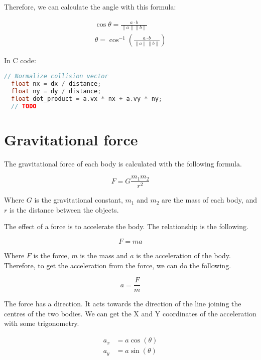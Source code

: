 \documentclass{amsart}
\begin{document}
Therefore, we can calculate the angle with this formula:

\begin{align*}
  \cos \theta = \frac{a \cdot b}{\|a\| \|b\|} \\
  \theta = \cos^{-1}(\frac{a \cdot b}{\|a\| \|b\|})
\end{align*}

In C code:

\begin{lstlisting}[language=C]
  // Normalize collision vector
  float nx = dx / distance;
  float ny = dy / distance;
  float dot_product = a.vx * nx + a.vy * ny;
  // TODO
\end{lstlisting}

\newpage

\section{Gravitational force}

The gravitational force of each body is calculated with the following formula.

\begin{displaymath}
  F = G \frac{m_1m_2}{r^2}
\end{displaymath}

Where $G$ is the gravitational constant, $m_1$ and $m_2$ are the mass of each
body, and $r$ is the distance between the objects.

The effect of a force is to accelerate the body. The relationship is the
following.

\begin{displaymath}
  F = m a
\end{displaymath}

Where $F$ is the force, $m$ is the mass and $a$ is the acceleration of the
body. Therefore, to get the acceleration from the force, we can do the
following.

\begin{displaymath}
  a = \frac{F}{m}
\end{displaymath}

The force has a direction. It acts towards the direction of the line joining
the centres of the two bodies. We can get the X and Y coordinates of the
acceleration with some trigonometry.

\begin{align*}
  a_x &= a \cos(\theta) \\
  a_y &= a \sin(\theta) \\
\end{align*}
\end{document}
